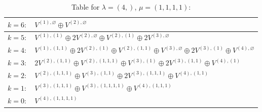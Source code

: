 \documentclass[a4paper,12pt]{article}
\begin{document}
\renewcommand{\arraystretch}{1.6} 
\begin{table}[H]
\centering
\caption{Table for $\lambda = (4,)$, $\mu = (1, 1, 1, 1)$:}
\begin{tabular}{|>{\centering\arraybackslash}p{15cm}|}
\hline
 $k = 6: \quad V^{(1), \varnothing} \oplus V^{(2), \varnothing} $ \\ \hline
 $k = 5: \quad V^{(1), (1)} \oplus 2 V^{(2), \varnothing} \oplus V^{(2), (1)} \oplus 2 V^{(3), \varnothing} $ \\ \hline
 $k = 4: \quad V^{(1), (1, 1)} \oplus 2 V^{(2), (1)} \oplus V^{(2), (1, 1)} \oplus V^{(3), \varnothing} \oplus 2 V^{(3), (1)} \oplus V^{(4), \varnothing} $ \\ \hline
 $k = 3: \quad 2 V^{(2), (1, 1)} \oplus V^{(2), (1, 1, 1)} \oplus V^{(3), (1)} \oplus 2 V^{(3), (1, 1)} \oplus V^{(4), (1)} $ \\ \hline
 $k = 2: \quad V^{(2), (1, 1, 1)} \oplus V^{(3), (1, 1)} \oplus 2 V^{(3), (1, 1, 1)} \oplus V^{(4), (1, 1)} $ \\ \hline
 $k = 1: \quad V^{(3), (1, 1, 1)} \oplus V^{(3), (1, 1, 1, 1)} \oplus V^{(4), (1, 1, 1)} $ \\ \hline
 $k = 0: \quad V^{(4), (1, 1, 1, 1)} $ \\ \hline
\end{tabular}
\end{table}
\end{document}
